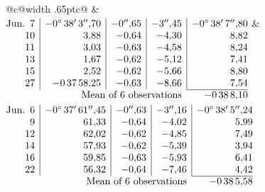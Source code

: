 \noindent\begin{tabular}{@{}c@{\hspace{.4em}\vrule width .65pt\hspace{.4em}}c@{}}
 &
 \\[.18ex]
\(\begin{array}[t]{@{}r|r|r|r|r@{}}
\text{Jun.}\enspace 7 & -0^\circ\,38'\,3''{,}70 & -0''{,}65 & -3''{,}45 & -0^\circ\,38'\,7''{,}80\\
10 & 3{,}88 & -0{,}64 & -4{,}30 & 8{,}82\\
11 & 3{,}03 & -0{,}63 & -4{,}58 & 8{,}24\\
13 & 1{,}67 & -0{,}62 & -5{,}12 & 7{,}41\\
15 & 2{,}52 & -0{,}62 & -5{,}66 & 8{,}80\\
27 & -0\,37\,58{,}25 & -0{,}63 & -8{,}66 & 7{,}54\\
\cline{5-5}
\multicolumn{4}{r}{\text{Mean of 6 observations}} & -0\,38\,8{,}10
\end{array}\)
&
\(\begin{array}[t]{@{}r|r|r|r|r@{}}
\text{Jun.}\enspace 6 & -0^\circ\,37'\,61''{,}45 & -0''{,}63 & -3''{,}16 & -0^\circ\,38'\,5''{,}24\\
9 & 61{,}33 & -0{,}64 & -4{,}02 & 5{,}99\\
12 & 62{,}02 & -0{,}62 & -4{,}85 & 7{,}49\\
14 & 57{,}93 & -0{,}62 & -5{,}39 & 3{,}94\\
16 & 59{,}85 & -0{,}63 & -5{,}93 & 6{,}41\\
22 & 56{,}32 & -0{,}64 & -7{,}46 & 4{,}42\\
\cline{5-5}
\multicolumn{4}{r}{\text{Mean of 6 observations}} & -0\,38\,5{,}58
\end{array}\)
\end{tabular}\par\medskip
{}

